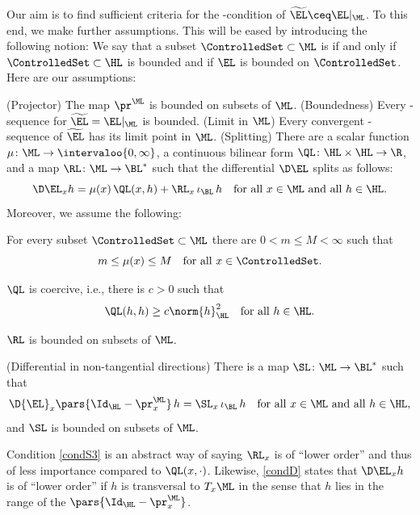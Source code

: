 Our aim is to find sufficient criteria for the \PaSma-condition of $\widetilde{\EL} \ceq \EL|_{\ML}$.
To this end, we make further assumptions.
This will be eased by introducing the following notion:
We say that a subset $\ControlledSet \subset \ML$ is \emph{\Econtrolled{\EL}} if and only if $\ControlledSet \subset \HL$ is bounded and if $\EL$ is bounded on $\ControlledSet$.
Here are our assumptions:
\begin{enumerate}
	\Item[\rm (P)]\label{condP}
	{\sc (Projector)}
	The map $\pr^{\ML}$ is bounded on \Econtrolled{\EL} subsets of $\ML$.
	\Item[\rm (B)]\label{condB}
	{\sc (Boundedness)}
	Every  \PaSma-sequence for $\widetilde{\EL} = \EL|_{\ML}$ is bounded.
	\Item[\rm (L)]\label{condL}
	{\sc (Limit in $\ML$)}
	Every convergent \PaSma-sequence of $\widetilde{\EL}$ has its limit point in $\ML$.
	\Item[\rm (S)]\label{condS}
	{\sc (Splitting)}
	There are 
	a scalar function $\mu \colon \ML \to \intervaloo{0,\infty}$,
	a continuous bilinear form $\QL \colon \HL \times \HL \to \R$,
	and 
	a map $\RL \colon \ML \to \BL^*$
	such that the differential $\D\EL$ splits as follows:
	\[
		\D\EL_x h = \mu(x) \, \QL(x,h) + \RL_x \, \iota_\BL \, h 
		\quad 
		\text{for all $x \in \ML$ and all $h \in\HL$.}
	\]
	Moreover, we assume the following:
	\begin{itemize}
	\Item[\rm (S1)]\label{condS1}
	For every \Econtrolled{\EL} subset $\ControlledSet \subset \ML$ there are $0 < m \leq M < \infty$ such that 
	\[
		m \leq \mu(x) \leq M \quad \text{for all $x\in\ControlledSet$.}
	\]
	
	\Item[\rm (S2)]\label{condS2}
		$\QL$ is coercive, i.e., there is $c > 0$ such that 
	\[
		\QL(h,h) \ge c \norm{h}_\HL^2
		\quad 
		\text{for all $h \in \HL$.}
	\]
	
	\Item[\rm (S3)]\label{condS3}
	$\RL$ is bounded on \Econtrolled{\EL} subsets of $\ML$.
	\end{itemize}

	\Item[\rm (D)]\label{condD}
	{\sc (Differential in non-tangential directions)}
	There is a map $\SL \colon \ML \to \BL^*$ such that 
	\[
		\D{\EL}_x \pars{\Id_\HL-\pr_x^\ML} \, h = \SL_x \, \iota_\BL \, h
		\quad 
		\text{for all $x \in \ML$ and all $h \in \HL$}, 
	\]
	and $\SL$ is bounded on \Econtrolled{\EL} subsets of $ \ML $.
\end{enumerate}

Condition \ref{condS3} is an abstract way of saying $\RL_x$ is of ``lower order'' and thus of less importance compared to $\QL(x,\cdot)$.
Likewise, \ref{condD} states that $\D \EL_x h$ is of ``lower order'' if $h$ is transversal to $T_x \ML$ in the sense that $h$ lies in the range of the $\pars{\Id_\HL-\pr_x^\ML}$.

